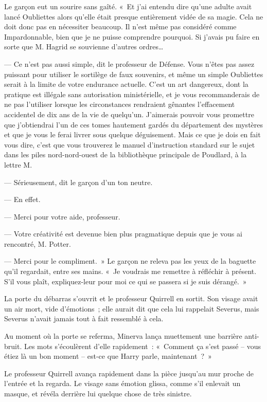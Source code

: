 Le garçon eut un sourire sans gaîté. «~Et j'ai entendu dire qu'une adulte avait lancé Oubliettes alors qu'elle était presque entièrement vidée de sa magie. Cela ne doit donc pas en nécessiter beaucoup. Il n'est même pas considéré comme Impardonnable, bien que je ne puisse comprendre pourquoi. Si j'avais pu faire en sorte que M. Hagrid se souvienne d'autres ordres…

--- Ce n'est pas aussi simple, dit le professeur de Défense. Vous n'êtes pas assez puissant pour utiliser le sortilège de faux souvenirs, et même un simple Oubliettes serait à la limite de votre endurance actuelle. C'est un art dangereux, dont la pratique est illégale sans autorisation ministérielle, et je vous recommanderais de ne pas l'utiliser lorsque les circonstances rendraient gênantes l'effacement accidentel de dix ans de la vie de quelqu'un. J'aimerais pouvoir vous promettre que j'obtiendrai l'un de ces tomes hautement gardés du département des mystères et que je vous le ferai livrer sous quelque déguisement. Mais ce que je dois en fait vous dire, c'est que vous trouverez le manuel d'instruction standard sur le sujet dans les piles nord-nord-ouest de la bibliothèque principale de Poudlard, à la lettre M.

--- Sérieusement, dit le garçon d'un ton neutre.

--- En effet.

--- Merci pour votre aide, professeur.

--- Votre créativité est devenue bien plus pragmatique depuis que je vous ai rencontré, M. Potter.

--- Merci pour le compliment.~» Le garçon ne releva pas les yeux de la baguette qu'il regardait, entre ses mains. «~Je voudrais me remettre à réfléchir à présent. S'il vous plaît, expliquez-leur pour moi ce qui se passera si je suis dérangé.~»

\later

La porte du débarras s'ouvrit et le professeur Quirrell en sortit. Son visage avait un air mort, vide d'émotions~; elle aurait dit que cela lui rappelait Severus, mais Severus n'avait jamais tout à fait ressemblé à cela.

Au moment où la porte se referma, Minerva lança muettement une barrière anti-bruit. Les mots s'écoulèrent d'elle rapidement~: «~Comment ça s'est passé -- vous étiez là un bon moment -- est-ce que Harry parle, maintenant~?~»

Le professeur Quirrell avança rapidement dans la pièce jusqu'au mur proche de l'entrée et la regarda. Le visage sans émotion glissa, comme s'il enlevait un masque, et révéla derrière lui quelque chose de très sinistre.

